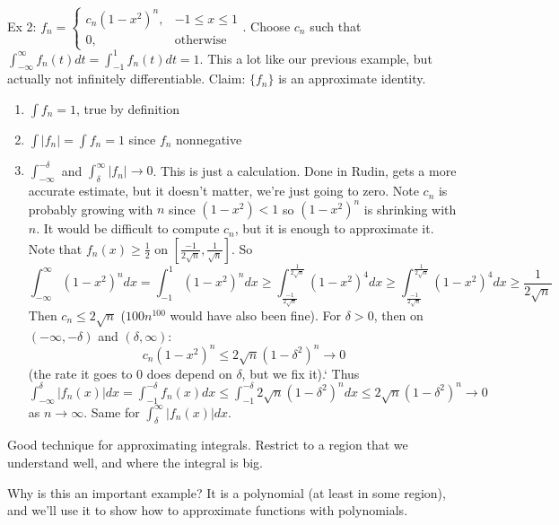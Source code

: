 \documentclass{article}
\theoremstyle{plain}
\theoremstyle{remark}
\begin{document}
Ex 2: $f_n = \begin{cases} c_n(1-x^2)^n, & -1 \leq x \leq 1 \\ 0, & \text{otherwise}\end{cases}$.
Choose $c_n$ such that $\int_{-\infty}^\infty f_n(t)dt = \int_{-1}^1 f_n(t)dt = 1$.
This a lot like our previous example, but actually not infinitely differentiable.
Claim: $\{f_n\}$ is an approximate identity.
\begin{enumerate}
	\item $\int f_n = 1$, true by definition
	\item $\int|f_n| = \int f_n = 1$ since $f_n$ nonnegative
	\item $\int_{-\infty}^{-\delta}$ and $\int_\delta^\infty |f_n| \to 0$.
		This is just a calculation.
		Done in Rudin, gets a more accurate estimate, but it doesn't matter,
		we're just going to zero.
		Note $c_n$ is probably growing with $n$ since $(1-x^2) < 1$
		so $(1-x^2)^n$ is shrinking with $n$.
		It would be difficult to compute $c_n$,
		but it is enough to approximate it.
		Note that $f_n(x) \geq \frac12$ on
		$\left[\frac{-1}{2\sqrt{n}}, \frac{1}{\sqrt{n}}\right]$. So
		\[
			\int_{-\infty}^\infty (1-x^2)^n dx
			= \int_{-1}^1 (1-x^2)^ndx \geq \int_{\frac{-1}{2\sqrt{n}}}
			^{\frac{1}{2\sqrt{n}}}(1-x^2)^4dx \geq
			\int_{\frac{-1}{2\sqrt{n}}} ^{\frac{1}{2\sqrt{n}}}(1-x^2)^4dx
			\geq \frac{1}{2\sqrt{n}}
		\]
		Then $c_n \leq 2\sqrt{n}$ ($100n^{100}$ would have also been fine).
		For $\delta > 0$, then on $(-\infty,-\delta)$ and $(\delta,\infty)$:
		\[
			c_n(1-x^2)^n \leq 2\sqrt{n}(1-\delta^2)^n \to 0
		\]
		(the rate it goes to $0$ does depend on $\delta$, but we fix it).`
		Thus $\int_{-\infty}^\delta |f_n(x)|dx = \int_{-1}^{-\delta}f_n(x)dx
		\leq \int_{-1}^{-\delta}2\sqrt{n}(1-\delta^2)^ndx
		\leq 2\sqrt{n}(1-\delta^2)^n \to 0$ as $n \to \infty$.
		Same for $\int_\delta^\infty |f_n(x)|dx$.
\end{enumerate}
Good technique for approximating integrals.
Restrict to a region that we understand well,
and where the integral is big.

Why is this an important example?
It is a polynomial (at least in some region),
and we'll use it to show how to approximate functions with polynomials.
\end{document}
